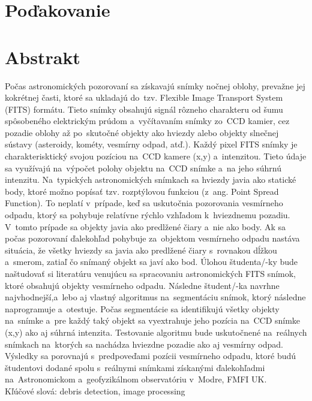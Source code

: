 \documentclass[12pt, a4paper, oneside]{book}
\begin{document}
\chapter*{Poďakovanie}\label{chap:thank_you}
\vfill\eject 

\chapter*{Abstrakt}\label{chap:abstract_sk}
Počas astronomických pozorovaní sa získavajú snímky nočnej oblohy, prevažne jej kokrétnej časti, ktoré sa ukladajú do tzv. Flexible Image Transport System (FITS) formátu. Tieto snímky obsahujú signál rôzneho charakteru od šumu spôsobeného elektrickým prúdom a vyčítavaním snímky zo CCD kamier, cez pozadie oblohy až po skutočné objekty ako hviezdy alebo objekty slnečnej sústavy (asteroidy, kométy, vesmírny odpad, atď.). Každý pixel FITS snímky je charakterisktický svojou pozíciou na CCD kamere (x,y) a intenzitou. Tieto údaje sa využívajú na výpočet polohy objektu na CCD snímke a na jeho súhrnú intenzitu.
Na typických astronomických snímkach sa hviezdy javia ako statické body, ktoré možno popísať tzv. rozptýlovou funkciou (z ang. Point Spread Function). To neplatí v prípade, keď sa uskutočnia pozorovania vesmírneho odpadu, ktorý sa pohybuje relatívne rýchlo vzhľadom k hviezdnemu pozadiu. V tomto prípade sa objekty javia ako predlžené čiary a nie ako body. Ak sa počas pozorovaní ďalekohľad pohybuje za objektom vesmírneho odpadu nastáva situácia, že všetky hviezdy sa javia ako predlžené čiary s rovnakou dĺžkou a smerom, zatiaľ čo snímaný objekt sa javí ako bod. 
Úlohou študenta/-ky bude naštudovať si literatúru venujúcu sa spracovaniu astronomických FITS snímok, ktoré obsahujú objekty vesmírneho odpadu. Následne študent/-ka navrhne najvhodnejší,a lebo aj vlastný algoritmus na segmentáciu snímok, ktorý následne naprogramuje a otestuje. Počas segmentácie sa identifikujú všetky objekty na snímke a pre každý taký objekt sa vyextrahuje jeho pozícia na CCD snímke (x,y) ako aj súhrná intenzita. Testovanie algoritmu bude uskutočnené na reálnych snímkach na ktorých sa nachádza hviezdne pozadie ako aj vesmírny odpad. Výsledky sa porovnajú s predpoveďami pozícii vesmírneho odpadu, ktoré budú študentovi dodané spolu s reálnymi snímkami získanými ďalekohľadmi na Astronomickom a geofyzikálnom observatóriu v Modre, FMFI UK.
~\\
Kľúčové slová: debris detection, image processing
\vfill\eject 
\end{document}
